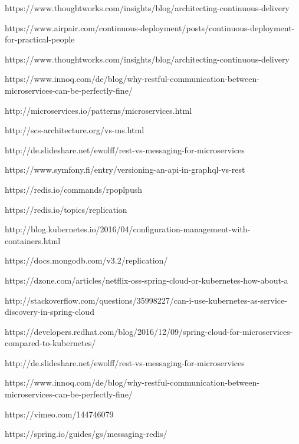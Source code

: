 https://www.thoughtworks.com/insights/blog/architecting-continuous-delivery

https://www.airpair.com/continuous-deployment/posts/continuous-deployment-for-practical-people

https://www.thoughtworks.com/insights/blog/architecting-continuous-delivery

https://www.innoq.com/de/blog/why-restful-communication-between-microservices-can-be-perfectly-fine/

http://microservices.io/patterns/microservices.html

http://scs-architecture.org/vs-ms.html

http://de.slideshare.net/ewolff/rest-vs-messaging-for-microservices

https://www.symfony.fi/entry/versioning-an-api-in-graphql-vs-rest

https://redis.io/commands/rpoplpush

https://redis.io/topics/replication

http://blog.kubernetes.io/2016/04/configuration-management-with-containers.html

https://docs.mongodb.com/v3.2/replication/

https://dzone.com/articles/netflix-oss-spring-cloud-or-kubernetes-how-about-a

http://stackoverflow.com/questions/35998227/can-i-use-kubernetes-as-service-discovery-in-spring-cloud

https://developers.redhat.com/blog/2016/12/09/spring-cloud-for-microservices-compared-to-kubernetes/

http://de.slideshare.net/ewolff/rest-vs-messaging-for-microservices

https://www.innoq.com/de/blog/why-restful-communication-between-microservices-can-be-perfectly-fine/

https://vimeo.com/144746079

https://spring.io/guides/gs/messaging-redis/